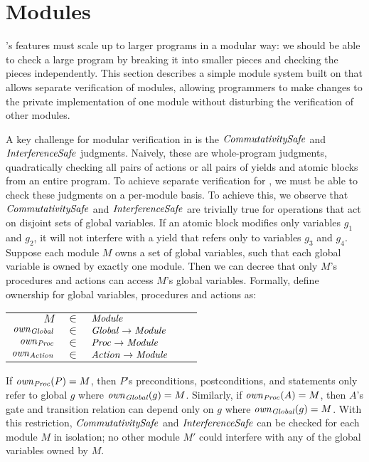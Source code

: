 \section{Modules}
\label{sec:modules}

\civl's features must scale up to larger programs in a modular way:
we should be able to check a large program by breaking it into smaller pieces and checking the pieces independently.
This section describes a simple module system built on \civl that allows separate verification of modules,
allowing programmers to make changes to the private implementation of one module
without disturbing the verification of other modules.

A key challenge for modular verification in \civl is the $\mathit{CommutativitySafe}$ and $\mathit{InterferenceSafe}$ judgments.
Naively, these are whole-program judgments,
quadratically checking all pairs of actions or all pairs of yields and atomic blocks from an entire program.
To achieve separate verification for \civl,
we must be able to check these judgments on a per-module basis.
To achieve this,
we observe that $\mathit{CommutativitySafe}$ and $\mathit{InterferenceSafe}$ are trivially true for operations that act on disjoint sets of global variables.
If an atomic block modifies only variables $g_1$ and $g_2$, it will not interfere with a yield that refers only to variables $g_3$ and $g_4$.
Suppose each module $M$ owns a set of global variables, such that each global variable is owned by exactly one module.
Then we can decree that only $M$'s procedures and actions can access $M$'s global variables.
Formally, define ownership for global variables, procedures and actions as:

\begin{tabular}{rclcl}
$M$ & $\in$ & $\mathit{Module}$ \\
$\mathit{own}_{\mathit{Global}}$ & $\in$ & $\mathit{Global} \rightarrow \mathit{Module}$ \\
$\mathit{own}_{\mathit{Proc}}$ & $\in$ & $\mathit{Proc} \rightarrow \mathit{Module}$ \\
$\mathit{own}_{\mathit{Action}}$ & $\in$ & $\mathit{Action} \rightarrow \mathit{Module}$ \\
\end{tabular}

If $\mathit{own}_{\mathit{Proc}}(P) = M$, then $P$'s preconditions, postconditions, and statements only refer to global $g$ where $\mathit{own}_{\mathit{Global}}(g) = M$.
Similarly, if $\mathit{own}_{\mathit{Proc}}(A) = M$, then $A$'s gate and transition relation can depend only on $g$ where $\mathit{own}_{\mathit{Global}}(g) = M$.
With this restriction, $\mathit{CommutativitySafe}$ and $\mathit{InterferenceSafe}$ can be checked for each module $M$ in isolation;
no other module $M'$ could interfere with any of the global variables owned by $M$.

